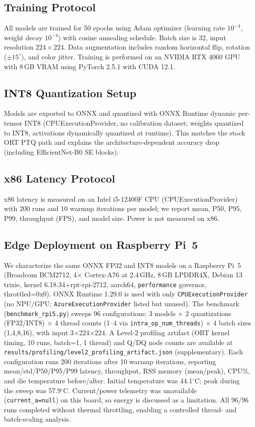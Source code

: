 \documentclass[conference,a4paper]{IEEEtran}
\begin{document}
\subsection{Training Protocol}
All models are trained for 50 epochs using Adam optimizer (learning rate $10^{-4}$, weight decay $10^{-4}$) with cosine annealing schedule. Batch size is 32, input resolution $224 \times 224$. Data augmentation includes random horizontal flip, rotation ($\pm 15^\circ$), and color jitter. Training is performed on an NVIDIA RTX 4060 GPU with 8\,GB VRAM using PyTorch 2.5.1 with CUDA 12.1.

\subsection{INT8 Quantization Setup}
Models are exported to ONNX and quantized with ONNX Runtime dynamic per-tensor INT8 (CPUExecutionProvider, no calibration dataset; weights quantized to INT8, activations dynamically quantized at runtime). This matches the stock ORT PTQ path and explains the architecture-dependent accuracy drop (including EfficientNet-B0 SE blocks).

\subsection{x86 Latency Protocol}
x86 latency is measured on an Intel i5-12400F CPU (CPUExecutionProvider) with 200 runs and 10 warmup iterations per model; we report mean, P50, P95, P99, throughput (FPS), and model size. Power is not measured on x86.

\subsection{Edge Deployment on Raspberry Pi~5}
We characterize the same ONNX FP32 and INT8 models on a Raspberry Pi~5 (Broadcom BCM2712, 4$\times$ Cortex-A76 at 2.4\,GHz, 8\,GB LPDDR4X, Debian 13 trixie, kernel 6.18.34+rpt-rpi-2712, aarch64, \texttt{performance} governor, throttled=0x0). ONNX Runtime 1.29.0 is used with only \texttt{CPUExecutionProvider} (no NPU/GPU; \texttt{AzureExecutionProvider} listed but unused). The benchmark (\texttt{benchmark\_rpi5.py}) sweeps 96 configurations: 3 models $\times$ 2 quantizations (FP32/INT8) $\times$ 4 thread counts (1--4 via \texttt{intra\_op\_num\_threads}) $\times$ 4 batch sizes (1,4,8,16), with input 3$\times$224$\times$224. A Level-2 profiling artifact (ORT kernel timing, 10 runs, batch=1, 1 thread) and Q/DQ node counts are available at \texttt{results/profiling/level2\_profiling\_artifact.json} (supplementary). Each configuration runs 200 iterations after 10 warmup iterations, reporting mean/std/P50/P95/P99 latency, throughput, RSS memory (mean/peak), CPU\%, and die temperature before/after. Initial temperature was 44.1$^{\circ}$C; peak during the sweep was 57.9$^{\circ}$C. Current/power telemetry was unavailable (\texttt{current\_a=null}) on this board, so energy is discussed as a limitation. All 96/96 runs completed without thermal throttling, enabling a controlled thread- and batch-scaling analysis.
\end{document}
